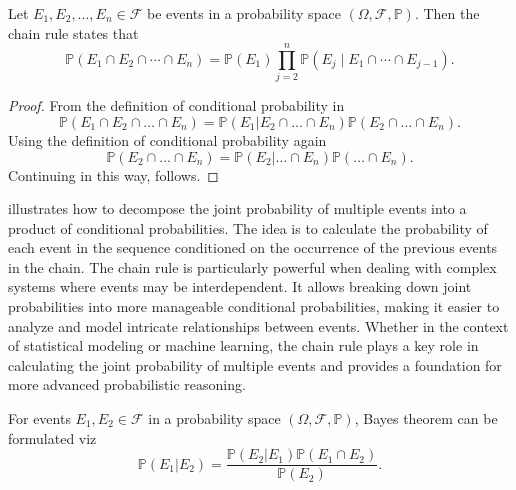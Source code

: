 \begin{theorem}
	\label{theorem:chain_rule}
	Let $E_1, E_2, \ldots, E_n \in \mathcal{F}$ be events in a probability space $(\Omega, \mathcal{F}, \mathbb{P})$. Then the chain rule states that
	\begin{equation}
		\mathbb{P}(E_1 \cap E_2 \cap \cdots \cap E_n) 
		= \mathbb{P}(E_1)\prod_{j=2}^{n}\mathbb{P}(E_j \mid E_1 \cap \cdots \cap E_{j-1}).
		\label{eq:prod}
	\end{equation}
\end{theorem}

\begin{proof}
	From the definition of conditional probability in 
	\begin{equation}
		\mathbb{P}(E_1 \cap E_2 \cap \ldots \cap E_n) = \mathbb{P}(E_1|E_2 \cap \dots \cap E_n)\mathbb{P}(E_2 \cap \dots \cap E_n).
		\label{eq:p1}
	\end{equation}
	Using the definition of conditional probability again
	\begin{equation}
		\mathbb{P}(E_2 \cap \ldots \cap E_n) = \mathbb{P}(E_2| \ldots \cap E_n)\mathbb{P}(\dots \cap E_n).
	\end{equation}
	Continuing in this way,  follows.
\end{proof}
\begin{remark}
	 illustrates how to decompose the joint probability of multiple events into a product of conditional probabilities. The idea is to calculate the probability of each event in the sequence conditioned on the occurrence of the previous events in the chain. The chain rule is particularly powerful when dealing with complex systems where events may be interdependent. It allows breaking down joint probabilities into more manageable conditional probabilities, making it easier to analyze and model intricate relationships between events. Whether in the context of statistical modeling or machine learning, the chain rule plays a key role in calculating the joint probability of multiple events and provides a foundation for more advanced probabilistic reasoning.
\end{remark}

\begin{theorem}
	\label{theorem:bayes_theorem}
	For events $E_1,E_2 \in \mathcal{F}$ in a probability space $(\Omega, \mathcal{F}, \mathbb{P})$, Bayes theorem can be formulated viz
	\begin{equation}
		\mathbb{P}(E_1| E_2) = \frac{\mathbb{P}(E_2| E_1)\mathbb{P}(E_1 \cap E_2)}{\mathbb{P}(E_2)}.
		\label{bayes_theorem}
	\end{equation}
\end{theorem}

